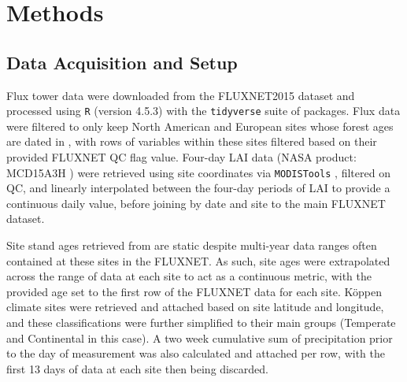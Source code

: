 \section{Methods}
\subsection{Data Acquisition and Setup}
Flux tower data were downloaded from the FLUXNET2015 dataset \cite{fluxnet2015} and processed using \texttt{R} (version 4.5.3) \parencite{why_R_you_reading_this} with the \texttt{tidyverse} \parencite{tidy_this_up} suite of packages. Flux data were filtered to only keep North American and European sites whose forest ages are dated in \textcite{besnard2018}, with rows of variables within these sites filtered based on their provided FLUXNET QC flag value. Four-day LAI data (NASA product: MCD15A3H \parencite{myneni2015}) were retrieved using site coordinates via \texttt{MODISTools} \parencite{hufkens2023bluegreen}, filtered on QC, and linearly interpolated between the four-day periods of LAI to provide a continuous daily value, before joining by date and site to the main FLUXNET dataset.\par Site stand ages retrieved from \textcite{besnard2018} are static despite multi-year data ranges often contained at these sites in the FLUXNET. As such, site ages were extrapolated across the range of data at each site to act as a continuous metric, with the provided age set to the first row of the FLUXNET data for each site. K\"{o}ppen climate sites were retrieved and attached based on site latitude and longitude, and these classifications were further simplified to their main groups (Temperate and Continental in this case). A two week cumulative sum of precipitation prior to the day of measurement was also calculated and attached per row, with the first 13 days of data at each site then being discarded. 


